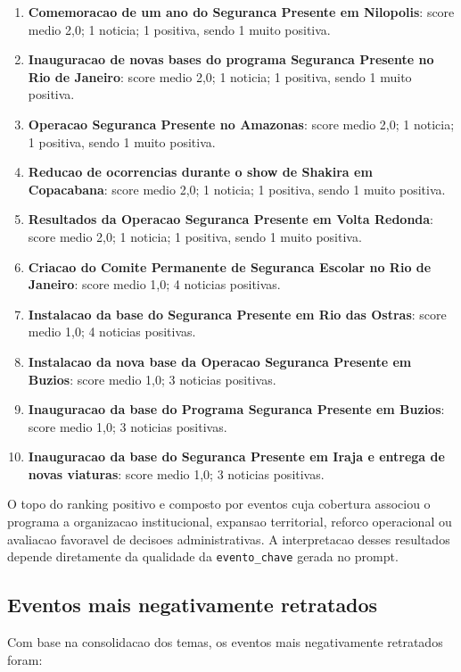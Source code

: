 \documentclass[12pt,a4paper]{article}
\begin{document}
\begin{enumerate}
    \item \textbf{Comemoracao de um ano do Seguranca Presente em Nilopolis}: score medio 2,0; 1 noticia; 1 positiva, sendo 1 muito positiva.
    \item \textbf{Inauguracao de novas bases do programa Seguranca Presente no Rio de Janeiro}: score medio 2,0; 1 noticia; 1 positiva, sendo 1 muito positiva.
    \item \textbf{Operacao Seguranca Presente no Amazonas}: score medio 2,0; 1 noticia; 1 positiva, sendo 1 muito positiva.
    \item \textbf{Reducao de ocorrencias durante o show de Shakira em Copacabana}: score medio 2,0; 1 noticia; 1 positiva, sendo 1 muito positiva.
    \item \textbf{Resultados da Operacao Seguranca Presente em Volta Redonda}: score medio 2,0; 1 noticia; 1 positiva, sendo 1 muito positiva.
    \item \textbf{Criacao do Comite Permanente de Seguranca Escolar no Rio de Janeiro}: score medio 1,0; 4 noticias positivas.
    \item \textbf{Instalacao da base do Seguranca Presente em Rio das Ostras}: score medio 1,0; 4 noticias positivas.
    \item \textbf{Instalacao da nova base da Operacao Seguranca Presente em Buzios}: score medio 1,0; 3 noticias positivas.
    \item \textbf{Inauguracao da base do Programa Seguranca Presente em Buzios}: score medio 1,0; 3 noticias positivas.
    \item \textbf{Inauguracao da base do Seguranca Presente em Iraja e entrega de novas viaturas}: score medio 1,0; 3 noticias positivas.
\end{enumerate}

O topo do ranking positivo e composto por eventos cuja cobertura associou o programa a organizacao institucional, expansao territorial, reforco operacional ou avaliacao favoravel de decisoes administrativas. A interpretacao desses resultados depende diretamente da qualidade da \texttt{evento\_chave} gerada no prompt.

\subsection{Eventos mais negativamente retratados}

Com base na consolidacao dos temas, os eventos mais negativamente retratados foram:
\end{document}
